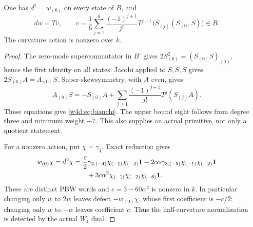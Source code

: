 \begin{proposition}\label{w4d:prop:curvature}
One has $d^2=w_{(0)}$ on every state of $B$, and
\begin{equation}\label{w4d:eq:bianchi}
 dw=T v,\qquad
 v=\frac16\sum_{j=1}^{8}\frac{(-1)^{j+1}}{j!}
       T^{j-1}\bigl(S_{(j)}(S_{(0)}S)\bigr)\in B.
\end{equation}
The curvature action is nonzero over $k$.
\end{proposition}
\begin{proof}
The zero-mode supercommutator in $B^\circ$ gives
$2S_{(0)}^2=(S_{(0)}S)_{(0)}$, hence the first identity on all states. Jacobi applied to $S,S,S$ gives $2S_{(0)}A=A_{(0)}S$. Super-skewsymmetry, with $A$ even, gives
\[
 A_{(0)}S=-S_{(0)}A+\sum_{j\geq1}\frac{(-1)^{j+1}}{j!}T^j(S_{(j)}A).
\]
These equations give \eqref{w4d:eq:bianchi}. The upper bound eight follows from degree three and minimum weight $-7$. This also supplies an actual primitive, not only a quotient statement.

For a nonzero action, put $\chi=\gamma_4$. Exact reduction gives
\begin{align}\label{w4d:eq:curvature-witness}
 w_{(0)}\chi=d^2\chi
 &=\frac c2\gamma_{2,(-4)}\chi_{(-1)}\chi_{(-2)}\mathbf1
 -2c\alpha\gamma_{3,(-5)}\chi_{(-1)}\chi_{(-2)}\mathbf1\notag\\
 &\qquad+3c\alpha^2\chi_{(-1)}\chi_{(-2)}\chi_{(-6)}\mathbf1.
\end{align}
These are distinct PBW words and $c=3-60\alpha^2$ is nonzero in $k$. In particular changing only $w$ to $2w$ leaves defect $-w_{(0)}\chi$, whose first coefficient is $-c/2$; changing only $w$ to $-w$ leaves coefficient $c$. Thus the half-curvature normalization is detected by the actual $W_4$ dual.
\end{proof}

